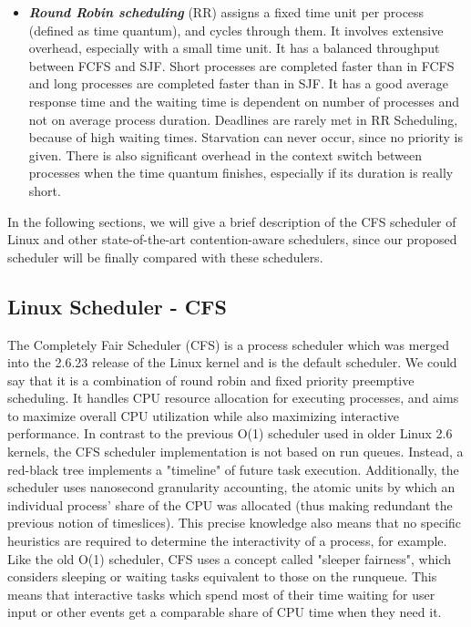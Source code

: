 \documentclass[diploma]{Styles/softlab-thesis}
\begin{document}
\begin{itemize}
\item \textbf{\emph{Round Robin scheduling}} (RR) assigns a fixed time unit per process (defined as time quantum), and cycles through them. It involves extensive overhead, especially with a small time unit. It has a balanced throughput between  FCFS and SJF. Short processes are completed faster than in FCFS and long processes are completed faster than in SJF. It has a good average response time and the waiting time is dependent on number of processes and not on average process duration. Deadlines are rarely met in RR Scheduling, because of high waiting times. Starvation can never occur, since no priority is given. There is also significant overhead in the context switch between processes when the time quantum finishes, especially if its duration is really short. \\
\end{itemize}

In the following sections, we will give a brief description of the CFS scheduler of Linux and other state-of-the-art contention-aware schedulers, since our proposed scheduler will be finally compared with these schedulers.

\subsection{Linux Scheduler - CFS}

The Completely Fair Scheduler (CFS) is a process scheduler which was merged into the 2.6.23 release of the Linux kernel and is the default scheduler. We could say that it is a combination of round robin and fixed priority preemptive scheduling. It handles CPU resource allocation for executing processes, and aims to maximize overall CPU utilization while also maximizing interactive performance. In contrast to the previous O(1) scheduler used in older Linux 2.6 kernels, the CFS scheduler implementation is not based on run queues. Instead, a red-black tree implements a "timeline" of future task execution. Additionally, the scheduler uses nanosecond granularity accounting, the atomic units by which an individual process' share of the CPU was allocated (thus making redundant the previous notion of timeslices). This precise knowledge also means that no specific heuristics are required to determine the interactivity of a process, for example. Like the old O(1) scheduler, CFS uses a concept called "sleeper fairness", which considers sleeping or waiting tasks equivalent to those on the runqueue. This means that interactive tasks which spend most of their time waiting for user input or other events get a comparable share of CPU time when they need it. \\
\end{document}
